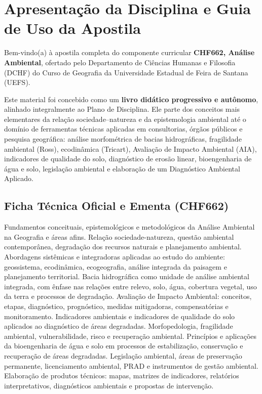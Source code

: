 \cleardoublepage
{}
{}
\chapter*{Apresentação da Disciplina e Guia de Uso da Apostila}

Bem-vindo(a) à apostila completa do componente curricular \textbf{CHF662, Análise Ambiental}, ofertado pelo Departamento de Ciências Humanas e Filosofia (DCHF) do Curso de Geografia da Universidade Estadual de Feira de Santana (UEFS).

Este material foi concebido como um \textbf{livro didático progressivo e autônomo}, alinhado integralmente ao Plano de Disciplina. Ele parte dos conceitos mais elementares da relação sociedade–natureza e da epistemologia ambiental até o domínio de ferramentas técnicas aplicadas em consultorias, órgãos públicos e pesquisa geográfica: análise morfométrica de bacias hidrográficas, fragilidade ambiental (Ross), ecodinâmica (Tricart), Avaliação de Impacto Ambiental (AIA), indicadores de qualidade do solo, diagnóstico de erosão linear, bioengenharia de água e solo, legislação ambiental e elaboração de um Diagnóstico Ambiental Aplicado.

\section*{Ficha Técnica Oficial e Ementa (CHF662)}

\begin{boxConceito}
Fundamentos conceituais, epistemológicos e metodológicos da Análise Ambiental na Geografia e áreas afins. Relação sociedade-natureza, questão ambiental contemporânea, degradação dos recursos naturais e planejamento ambiental. Abordagens sistêmicas e integradoras aplicadas ao estudo do ambiente: geossistema, ecodinâmica, ecogeografia, análise integrada da paisagem e planejamento territorial. Bacia hidrográfica como unidade de análise ambiental integrada, com ênfase nas relações entre relevo, solo, água, cobertura vegetal, uso da terra e processos de degradação. Avaliação de Impacto Ambiental: conceitos, etapas, diagnóstico, prognóstico, medidas mitigadoras, compensatórias e monitoramento. Indicadores ambientais e indicadores de qualidade do solo aplicados ao diagnóstico de áreas degradadas. Morfopedologia, fragilidade ambiental, vulnerabilidade, risco e recuperação ambiental. Princípios e aplicações da bioengenharia de água e solo em processos de estabilização, conservação e recuperação de áreas degradadas. Legislação ambiental, áreas de preservação permanente, licenciamento ambiental, PRAD e instrumentos de gestão ambiental. Elaboração de produtos técnicos: mapas, matrizes de indicadores, relatórios interpretativos, diagnósticos ambientais e propostas de intervenção.
\end{boxConceito}

